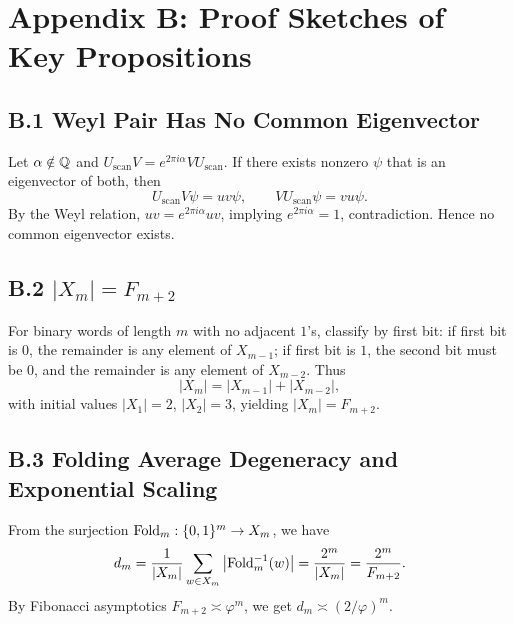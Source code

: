 \section{Appendix B: Proof Sketches of Key Propositions}

\subsection{B.1 Weyl Pair Has No Common Eigenvector}

Let $\alpha\notin\mathbb{Q}$ and $U_{\mathrm{scan}}V=e^{2\pi i\alpha}VU_{\mathrm{scan}}$. If there exists nonzero $\psi$ that is an eigenvector of both, then
\[
U_{\mathrm{scan}}V\psi=uv\psi,\qquad
VU_{\mathrm{scan}}\psi=vu\psi.
\]
By the Weyl relation, $uv=e^{2\pi i\alpha}uv$, implying $e^{2\pi i\alpha}=1$, contradiction. Hence no common eigenvector exists.

\subsection{B.2 $|X_m|=F_{m+2}$}

For binary words of length $m$ with no adjacent $1$'s, classify by first bit: if first bit is $0$, the remainder is any element of $X_{m-1}$; if first bit is $1$, the second bit must be $0$, and the remainder is any element of $X_{m-2}$. Thus
\[
|X_m|=|X_{m-1}|+|X_{m-2}|,
\]
with initial values $|X_1|=2$, $|X_2|=3$, yielding $|X_m|=F_{m+2}$.

\subsection{B.3 Folding Average Degeneracy and Exponential Scaling}

From the surjection $\mathrm{Fold}_m:\{0,1\}^m\to X_m$, we have
\[
d_m=\frac{1}{|X_m|}\sum_{w\in X_m}\big|\mathrm{Fold}_m^{-1}(w)\big|=\frac{2^m}{|X_m|}=\frac{2^m}{F_{m+2}}.
\]
By Fibonacci asymptotics $F_{m+2}\asymp \varphi^{m}$, we get $d_m\asymp (2/\varphi)^m$.
